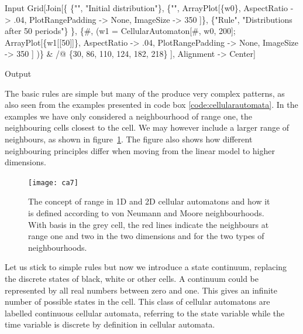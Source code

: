 \documentclass[11pt,fleqn]{book} %
\begin{document}
\begin{theorem}
\begin{mmaCell}{Input}
  Grid[Join[\{
    \{"", "Initial distribution"\},
    \{"",
      ArrayPlot[\{w0\}, 
        AspectRatio      -> .04, 
        PlotRangePadding -> None,
        ImageSize        -> 350
      ]\},
      \{"Rule", "Distributions after 50 periods"\}
    \},
    \{#, (w1 = CellularAutomaton[#, w0, 200];
      ArrayPlot[\{w1[[50]]\}, 
        AspectRatio      -> .04, 
        PlotRangePadding -> None, 
        ImageSize        -> 350
      ]
     )\} & /@ \{30, 86, 110, 124, 182, 218\}
   ], Alignment -> Center]
\end{mmaCell}
\begin{mmaCell}[moregraphics={moreig={scale=1.1}}]{Output}
\end{mmaCell}
\label{code:cellularautomata}
\end{theorem}

The basic rules are simple but many of the produce very complex patterns, as also seen from the examples presented in code box \ref{code:cellularautomata}. In the examples we have only considered a neighbourhood of range one, the neighbouring cells closest to the cell. We may however include a larger range of neighbours, as shown in figure~\ref{fig:CArange}. The figure also shows how different neighbouring principles differ when moving from the linear model to higher dimensions.

\begin{figure}[ht]
\centering\texttt{[image: ca7]} 
\caption{The concept of range in 1D and 2D cellular automatons and how it is defined according to von Neumann and Moore neighbourhoods. With basis in the grey cell, the red lines indicate the neighbours at range one and two in the two dimensions and for the two types of neighbourhoods.\\}
\label{fig:CArange}
\end{figure}

Let us stick to simple rules but now we introduce a state continuum, replacing the discrete states of black, white or other cells. A continuum could be represented by all real numbers between zero and one. This gives an infinite number of possible states in the cell. This class of cellular automatons are labelled continuous cellular automata, referring to the state variable while the time variable is discrete by definition in cellular automata.
\end{document}
